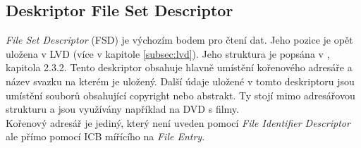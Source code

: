 \subsection{Deskriptor File Set Descriptor}
\label{subsec:fsd}
\textit{File Set Descriptor} (FSD) je výchozím bodem pro čtení dat. Jeho pozice je opět uložena v LVD (více v kapitole \ref{subsec:lvd}). Jeho struktura je popsána v \cite{osta-udf-0201}, kapitola 2.3.2. Tento deskriptor obsahuje hlavně umístění kořenového adresáře a název svazku na kterém je uložený. Další údaje uložené v tomto deskriptoru jsou umístění souborů obsahující copyright nebo abstrakt. Ty stojí mimo adresářovou strukturu a jsou využívány například na DVD s filmy.\\
Kořenový adresář je jediný, který není uveden pomocí \textit{File Identifier Descriptor} ale přímo pomocí ICB mířícího na \textit{File Entry}. 

